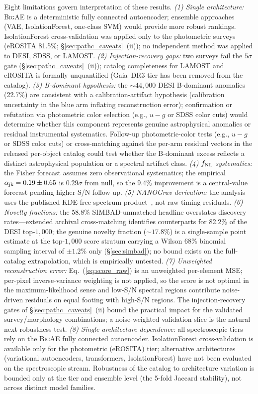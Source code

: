 \documentclass[aps,prd,twocolumn,superscriptaddress,showpacs,preprintnumbers,nofootinbib,longbibliography,floatfix]{revtex4-2}
\newcommand{\BigAE}{\textsc{BigAE}}
\begin{document}
Eight limitations govern interpretation of these results. \emph{(1) Single architecture:} \BigAE{} is a deterministic fully connected autoencoder; ensemble approaches (VAE, IsolationForest, one-class SVM) would provide more robust rankings. IsolationForest cross-validation was applied only to the photometric surveys (eROSITA 81.5\%; \S\ref{sec:pathc_caveats}~(ii)); no independent method was applied to DESI, SDSS, or LAMOST. \emph{(2) Injection-recovery gaps:} two surveys fail the $5\sigma$ gate (\S\ref{sec:pathc_caveats}~(ii)); catalog completeness for LAMOST and eROSITA is formally unquantified (Gaia~DR3 tier has been removed from the catalog). \emph{(3) B-dominant hypothesis:} the $\sim\!44{,}000$ DESI B-dominant anomalies (22.7\%) are consistent with a calibration-artifact hypothesis (calibration uncertainty in the blue arm inflating reconstruction error); confirmation or refutation via photometric color selection (e.g., $u{-}g$ or SDSS color cuts) would determine whether this component represents genuine astrophysical anomalies or residual instrumental systematics. Follow-up photometric-color tests (e.g., $u{-}g$ or SDSS color cuts) or cross-matching against the per-arm residual vectors in the released per-object catalog could test whether the B-dominant excess reflects a distinct astrophysical population or a spectral artifact class. \emph{(4) $f_{\rm NL}$ systematics:} the Fisher forecast assumes zero observational systematics; the empirical $\alpha_{\rm jk} = 0.19 \pm 0.65$ is $0.29\sigma$ from null, so the $9.4\%$ improvement is a central-value forecast pending higher-S/N follow-up. \emph{(5) NANOGrav derivation:} the analysis uses the published KDE free-spectrum product~\cite{NANOGrav2023}, not raw timing residuals. \emph{(6) Novelty fractions:} the 58.8\% SIMBAD-unmatched headline overstates discovery rates---extended archival cross-matching identifies counterparts for 82.2\% of the DESI top-$1{,}000$; the genuine novelty fraction ($\sim\!17.8\%$) is a single-sample point estimate at the top-$1{,}000$ score stratum carrying a Wilson 68\% binomial sampling interval of $\pm 1.2\%$ only (\S\ref{sec:simbad}); no bound exists on the full-catalog extrapolation, which is empirically untested. \emph{(7) Unweighted reconstruction error:} Eq.~(\ref{eq:score_raw}) is an unweighted per-element MSE; per-pixel inverse-variance weighting is not applied, so the score is not optimal in the maximum-likelihood sense and low-S/N spectral regions contribute noise-driven residuals on equal footing with high-S/N regions. The injection-recovery gates of \S\ref{sec:pathc_caveats}~(ii) bound the practical impact for the validated survey/morphology combinations; a noise-weighted validation slice is the natural next robustness test. \emph{(8) Single-architecture dependence:} all spectroscopic tiers rely on the \BigAE{} fully connected autoencoder. IsolationForest cross-validation is available only for the photometric (eROSITA) tier; alternative architectures (variational autoencoders, transformers, IsolationForest) have not been evaluated on the spectroscopic stream. Robustness of the catalog to architecture variation is bounded only at the tier and ensemble level (the 5-fold Jaccard stability), not across distinct model families.
\end{document}
